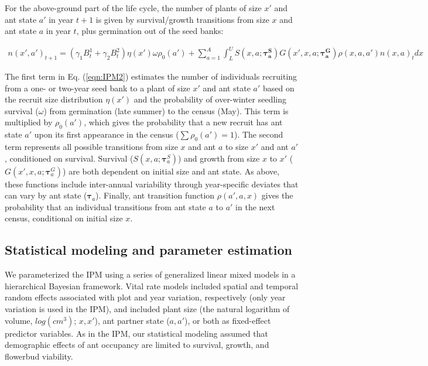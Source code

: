 \documentclass[11pt]{article}
\begin{document}
For the above-ground part of the life cycle, the number of plants of size $x'$ and ant state $a'$ in year $t+1$ is given by survival/growth transitions from size $x$ and ant state $a$ in year $t$, plus germination out of the seed banks:
\begin{linenomath*} 
	\begin{gather}
		\label{eqn:IPM2}
n(x',a')_{t+1} = (\gamma_1 B^1_{t} + \gamma_2 B^2_{t} ) \eta(x') \omega \rho_{0}(a')  + 
\sum_{a=1}^{A} \int_L^U S(x,a;\pmb{\tau^S_{a}}) G(x',x,a;\pmb{\tau^G_{a}}) \rho(x,a,a') n(x,a)_t dx 
	\end{gather}
\end{linenomath*}
\noindent The first term in Eq. (\ref{eqn:IPM2}) estimates the number of individuals recruiting from a one- or two-year seed bank to a plant of size $x'$ and ant state $a'$ based on the recruit size distribution $\eta(x')$ and the probability of over-winter seedling survival ($\omega$) from germination (late summer) to the census (May).
This term is multiplied by $\rho_{0}(a')$, which gives the probability that a new recruit has ant state $a'$ upon its first appearance in the census ($\sum\rho_{0}(a')=1$). 
The second term represents all possible transitions from size $x$ and ant $a$ to size $x'$ and ant $a'$, conditioned on survival. 
Survival ($S(x,a;\pmb{\tau}^S_{a})$) and growth from size $x$ to $x'$ ($G(x',x,a;\pmb{\tau}^G_{a})$) are both dependent on initial size and ant state. 
As above, these functions include inter-annual variability through year-specific deviates that can vary by ant state ($\pmb{\tau}_{a}$). 
Finally, ant transition function $\rho(a',a,x)$ gives the probability that an individual transitions from ant state $a$ to $a'$ in the next census, conditional on initial size $x$. 

\subsection*{Statistical modeling and parameter estimation}
We parameterized the IPM using a series of generalized linear mixed models in a hierarchical Bayesian framework. 
Vital rate models included spatial and temporal random effects associated with plot and year variation, respectively (only year variation is used in the IPM), and included plant size (the natural logarithm of volume, $log(cm^3)$; $x,x'$), ant partner state ($a,a'$), or both as fixed-effect predictor variables. 
As in the IPM, our statistical modeling assumed that demographic effects of ant occupancy are limited to survival, growth, and flowerbud viability. 
\end{document}
